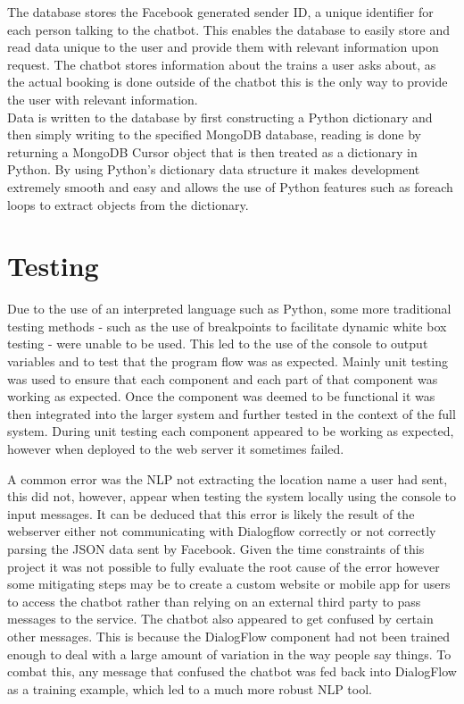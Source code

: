 \documentclass[12pt,a4paper]{article}
\begin{document}
    The database stores the Facebook generated sender ID, a unique identifier for each person talking to the chatbot. This enables the database to easily store and read data unique to the user and provide them with relevant information upon request. The chatbot stores information about the trains a user asks about, as the actual booking is done outside of the chatbot this is the only way to provide the user with relevant information. \\
    
    Data is written to the database by first constructing a Python dictionary and then simply writing to the specified MongoDB database, reading is done by returning a MongoDB Cursor object that is then treated as a dictionary in Python. By using Python's dictionary data structure it makes development extremely smooth and easy and allows the use of Python features such as foreach loops to extract objects from the dictionary.
    
    \section{Testing}
    
    Due to the use of an interpreted language such as Python, some more traditional testing methods - such as the use of breakpoints to facilitate dynamic white box testing - were unable to be used. This led to the use of the console to output variables and to test that the program flow was as expected.
    Mainly unit testing was used to ensure that each component and each part of that component was working as expected. Once the component was deemed to be functional it was then integrated into the larger system and further tested in the context of the full system.
    During unit testing each component appeared to be working as expected, however when deployed to the web server it sometimes failed. 
    
    A common error was the NLP not extracting the location name a user had sent, this did not, however, appear when testing the system locally using the console to input messages. It can be deduced that this error is likely the result of the webserver either not communicating with Dialogflow correctly or not correctly parsing the JSON data sent by Facebook. Given the time constraints of this project it was not possible to fully evaluate the root cause of the error however some mitigating steps may be to create a custom website or mobile app for users to access the chatbot rather than relying on an external third party to pass messages to the service. The chatbot also appeared to get confused by certain other messages. This is because the DialogFlow component had not been trained enough to deal with a large amount of variation in the way people say things. To combat this, any message that confused the chatbot was fed back into DialogFlow as a training example, which led to a much more robust NLP tool.
    
\end{document}
